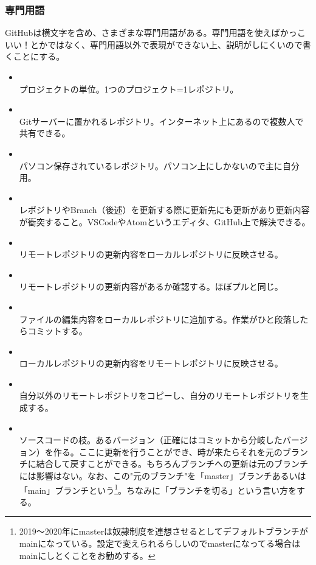 \documentclass[dvipdfmx,jb5]{jarticle}
\begin{document}
\subsubsection{専門用語}
GitHubは横文字を含め、さまざまな専門用語がある。専門用語を使えばかっこいい！とかではなく、専門用語以外で表現ができない上、説明がしにくいので書くことにする。
\begin{itemize}
\item {}\\
プロジェクトの単位。1つのプロジェクト=1レポジトリ。
\item {}\\
Gitサーバーに置かれるレポジトリ。インターネット上にあるので複数人で共有できる。
\item {}\\
パソコン保存されているレポジトリ。パソコン上にしかないので主に自分用。
\item {}\\
レポジトリやBranch（後述）を更新する際に更新先にも更新があり更新内容が衝突すること。VSCodeやAtomというエディタ、GitHub上で解決できる。
\item {}\\
リモートレポジトリの更新内容をローカルレポジトリに反映させる。
\item {}\\
リモートレポジトリの更新内容があるか確認する。ほぼプルと同じ。
\item {}\\
ファイルの編集内容をローカルレポジトリに追加する。作業がひと段落したらコミットする。
\item {}\\
ローカルレポジトリの更新内容をリモートレポジトリに反映させる。
\item {}\\
自分以外のリモートレポジトリをコピーし、自分のリモートレポジトリを生成する。
\item {}\\
ソースコードの枝。あるバージョン（正確にはコミットから分岐したバージョン）を作る。ここに更新を行うことができ、時が来たらそれを元のブランチに結合して戻すことができる。もちろんブランチへの更新は元のブランチには影響はない。なお、この"元のブランチ"を「master」ブランチあるいは「main」ブランチという\footnote{2019〜2020年にmasterは奴隷制度を連想させるとしてデフォルトブランチがmainになっている。設定で変えられるらしいのでmasterになってる場合はmainにしとくことをお勧めする。}。ちなみに「ブランチを切る」という言い方をする。

\end{itemize}
\end{document}
